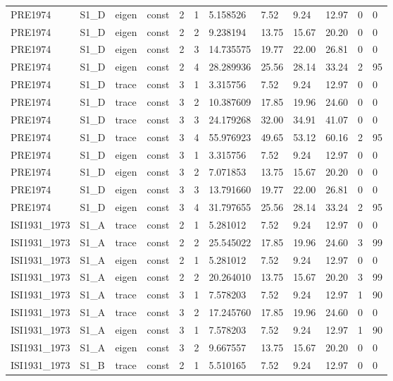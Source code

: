 \begin{tabular}{llllllllllll}
PRE1974 & S1\_D & eigen & const & 2 & 1 & 5.158526 & 7.52 & 9.24 & 12.97 & 0 & 0 \\
PRE1974 & S1\_D & eigen & const & 2 & 2 & 9.238194 & 13.75 & 15.67 & 20.20 & 0 & 0 \\
PRE1974 & S1\_D & eigen & const & 2 & 3 & 14.735575 & 19.77 & 22.00 & 26.81 & 0 & 0 \\
PRE1974 & S1\_D & eigen & const & 2 & 4 & 28.289936 & 25.56 & 28.14 & 33.24 & 2 & 95 \\
PRE1974 & S1\_D & trace & const & 3 & 1 & 3.315756 & 7.52 & 9.24 & 12.97 & 0 & 0 \\
PRE1974 & S1\_D & trace & const & 3 & 2 & 10.387609 & 17.85 & 19.96 & 24.60 & 0 & 0 \\
PRE1974 & S1\_D & trace & const & 3 & 3 & 24.179268 & 32.00 & 34.91 & 41.07 & 0 & 0 \\
PRE1974 & S1\_D & trace & const & 3 & 4 & 55.976923 & 49.65 & 53.12 & 60.16 & 2 & 95 \\
PRE1974 & S1\_D & eigen & const & 3 & 1 & 3.315756 & 7.52 & 9.24 & 12.97 & 0 & 0 \\
PRE1974 & S1\_D & eigen & const & 3 & 2 & 7.071853 & 13.75 & 15.67 & 20.20 & 0 & 0 \\
PRE1974 & S1\_D & eigen & const & 3 & 3 & 13.791660 & 19.77 & 22.00 & 26.81 & 0 & 0 \\
PRE1974 & S1\_D & eigen & const & 3 & 4 & 31.797655 & 25.56 & 28.14 & 33.24 & 2 & 95 \\
ISI1931\_1973 & S1\_A & trace & const & 2 & 1 & 5.281012 & 7.52 & 9.24 & 12.97 & 0 & 0 \\
ISI1931\_1973 & S1\_A & trace & const & 2 & 2 & 25.545022 & 17.85 & 19.96 & 24.60 & 3 & 99 \\
ISI1931\_1973 & S1\_A & eigen & const & 2 & 1 & 5.281012 & 7.52 & 9.24 & 12.97 & 0 & 0 \\
ISI1931\_1973 & S1\_A & eigen & const & 2 & 2 & 20.264010 & 13.75 & 15.67 & 20.20 & 3 & 99 \\
ISI1931\_1973 & S1\_A & trace & const & 3 & 1 & 7.578203 & 7.52 & 9.24 & 12.97 & 1 & 90 \\
ISI1931\_1973 & S1\_A & trace & const & 3 & 2 & 17.245760 & 17.85 & 19.96 & 24.60 & 0 & 0 \\
ISI1931\_1973 & S1\_A & eigen & const & 3 & 1 & 7.578203 & 7.52 & 9.24 & 12.97 & 1 & 90 \\
ISI1931\_1973 & S1\_A & eigen & const & 3 & 2 & 9.667557 & 13.75 & 15.67 & 20.20 & 0 & 0 \\
ISI1931\_1973 & S1\_B & trace & const & 2 & 1 & 5.510165 & 7.52 & 9.24 & 12.97 & 0 & 0 \\

\end{tabular}
